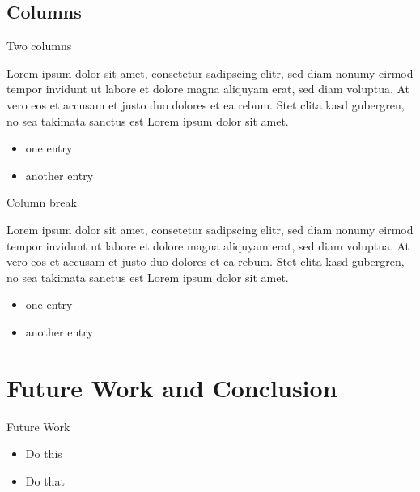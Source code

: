 \documentclass[xcolor={svgnames},12pt,aspectratio=169,handout]{beamer}
\begin{document}
\subsection{Columns}

\begin{frame}{Two columns}
    \begin{multicols}{2}
        Lorem ipsum dolor sit amet, consetetur sadipscing elitr, sed diam nonumy eirmod tempor invidunt ut labore et dolore magna aliquyam erat, sed diam voluptua. At vero eos et accusam et justo duo dolores et ea rebum. Stet clita kasd gubergren, no sea takimata sanctus est Lorem ipsum dolor sit amet.

        \begin{itemize}
            \item one entry
            \item another entry
        \end{itemize}
    \end{multicols}
\end{frame}

\begin{frame}{Column break}
    \begin{multicols}{2}
        Lorem ipsum dolor sit amet, consetetur sadipscing elitr, sed diam nonumy eirmod tempor invidunt ut labore et dolore magna aliquyam erat, sed diam voluptua. At vero eos et accusam et justo duo dolores et ea rebum. Stet clita kasd gubergren, no sea takimata sanctus est Lorem ipsum dolor sit amet.

        \columnbreak
        \begin{itemize}
            \item one entry
            \item another entry
        \end{itemize}
    \end{multicols}
\end{frame}

\section{Future Work and Conclusion}

\begin{frame}{Future Work}
    \begin{itemize}
        \item Do this
        \item Do that
    \end{itemize}
\end{frame}
\end{document}
